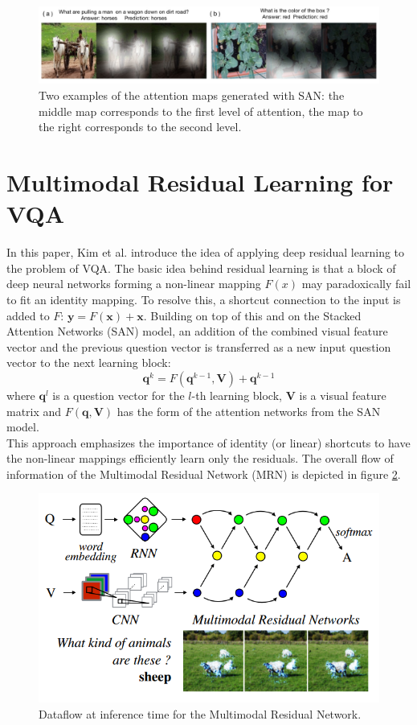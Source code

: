 \documentclass{article}
\begin{document}
    \begin{figure}[ht]
    	\centering
            \includegraphics[width=1.0\linewidth]{sanMaps.PNG}
    	\caption{Two examples of the attention maps generated with SAN: the middle map corresponds to the first level of attention, the map to the right corresponds to the second level.}
    	\label{sanMaps}
    \end{figure}

\section{Multimodal Residual Learning for VQA}
In this paper, Kim et al. \citep{DBLP:corrKim16} introduce the idea of applying deep residual learning to the problem of VQA. The basic idea behind residual learning is that a block of deep neural networks forming a non-linear mapping $F(x)$ may paradoxically fail to fit an identity mapping. To resolve this, a shortcut connection to the input is added to $F$: $\bm{y} = F(\bm{x}) + \bm{x}$. Building on top of this and on the Stacked Attention Networks (SAN) model, an addition of the combined visual feature vector and the previous question vector is transferred as a new input question vector to the next learning block:
\begin{equation*}
    \bm{q}^k = F(\bm{q}^{k-1}, \bm{V}) + \bm{q}^{k-1}
\end{equation*}
where $\bm{q}^l$ is a question vector for the $l$-th learning block, $\bm{V}$ is a visual feature matrix and $F(\bm{q},\bm{V})$ has the form of the attention networks from the SAN model.\\
This approach emphasizes the importance of identity (or linear) shortcuts to have the non-linear mappings efficiently learn only the residuals. The overall flow of information of the Multimodal Residual Network (MRN) is depicted in figure \ref{mrnInference}.

    \begin{figure}[ht]
    	\centering
            \includegraphics[width=0.5\linewidth]{mrnInference.PNG}
    	\caption{Dataflow at inference time for the Multimodal Residual Network.}
    	\label{mrnInference}
    \end{figure}
\end{document}
